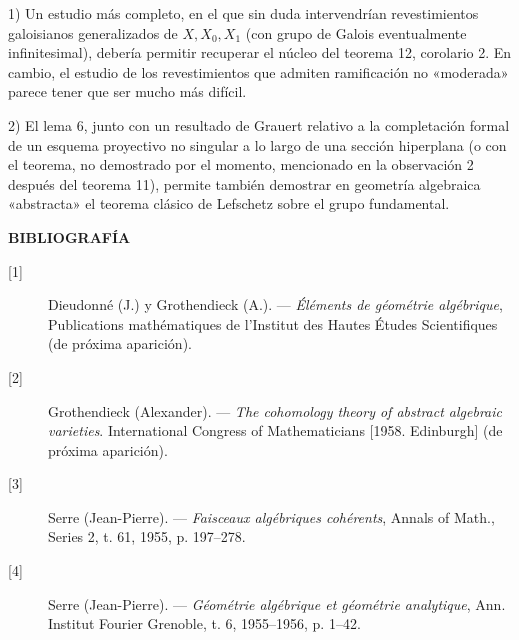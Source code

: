 
1) Un estudio más completo, en el que sin duda intervendrían revestimientos
galoisianos generalizados de $X,X_0,X_1$ (con grupo de Galois eventualmente
infinitesimal), debería permitir recuperar el núcleo del teorema 12, corolario
2. En cambio, el estudio de los revestimientos que admiten ramificación no
«moderada» parece tener que ser mucho más difícil.

2) El lema 6, junto con un resultado de Grauert relativo a la completación
formal de un esquema proyectivo no singular a lo largo de una sección
hiperplana (o con el teorema, no demostrado por el momento, mencionado en la
observación 2 después del teorema 11), permite también demostrar en geometría
algebraica «abstracta» el teorema clásico de Lefschetz sobre el grupo
fundamental.

\begin{center}
  \textbf{BIBLIOGRAFÍA}
\end{center}

\begin{description}
  \item[{[1]}] Dieudonné (J.) y Grothendieck (A.). --- \emph{Éléments de
    géométrie algébrique}, Publications mathématiques de l'Institut des Hautes
    Études Scientifiques (de próxima aparición).
  \item[{[2]}] Grothendieck (Alexander). --- \emph{The cohomology theory of
    abstract algebraic varieties}. International Congress of Mathematicians
    [1958. Edinburgh] (de próxima aparición).
  \item[{[3]}] Serre (Jean-Pierre). --- \emph{Faisceaux algébriques
    cohérents}, Annals of Math., Series 2, t. 61, 1955, p. 197--278.
  \item[{[4]}] Serre (Jean-Pierre). --- \emph{Géométrie algébrique et
    géométrie analytique}, Ann. Institut Fourier Grenoble, t. 6, 1955--1956,
    p. 1--42.
\end{description}
